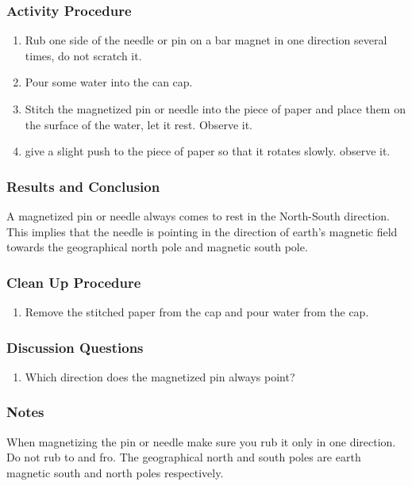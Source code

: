 \subsubsection*{Activity Procedure}
\begin{enumerate}
\item{Rub one side of the needle or pin on a bar magnet in one direction several times, do not scratch it.} 
\item{Pour some water into the can cap.} 
\item{Stitch the magnetized pin or needle into the piece of paper and place them on the surface of the water, let it rest. Observe it.} 
\item{give a slight push to the piece of paper so that it rotates slowly.  observe it.} 
\end{enumerate}

\subsubsection*{Results and Conclusion}
A magnetized pin or needle always comes to rest in the North-South direction.  This implies that the needle is pointing in the direction of earth's magnetic field towards the geographical north pole and magnetic south pole.  

\subsubsection*{Clean Up Procedure}
\begin{enumerate}
\item{Remove the stitched paper from the cap and pour water from the cap.} 
\end{enumerate}

\subsubsection*{Discussion Questions}
\begin{enumerate}
\item{Which direction does the magnetized pin always point?}
\end{enumerate}

\subsubsection*{Notes}
When magnetizing the pin or needle make sure you rub it only in one direction. Do not rub to and fro.  The geographical north and south poles are earth magnetic south and north poles respectively.  

